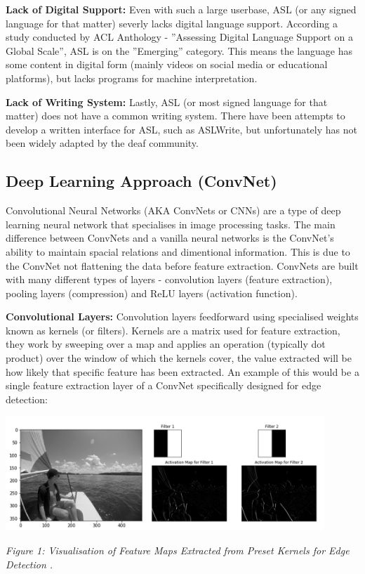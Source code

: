 \documentclass[11pt]{article}
\def\paraskip{\vskip 0.4cm}
\begin{document}
        \noindent\textbf{Lack of Digital Support:} Even with such a large userbase, ASL (or any signed language for that matter) severly lacks digital language support. According a study conducted by ACL Anthology - ”Assessing Digital Language Support on a Global Scale”, ASL is on the ”Emerging” category. This means the language has some content in digital form (mainly videos on social media or educational platforms), but lacks programs for machine interpretation.
        \paraskip

        \noindent\textbf{Lack of Writing System:} Lastly, ASL (or most signed language for that matter) does not have a common writing system. There have been attempts to develop a written interface for ASL, such as ASLWrite, but unfortunately has not been widely adapted by the deaf community.

    \subsection{Deep Learning Approach (ConvNet)}
        Convolutional Neural Networks (AKA ConvNets or CNNs) are a type of deep learning neural network that specialises in image processing tasks. The main difference between ConvNets and a vanilla neural networks is the ConvNet's ability to maintain spacial relations and dimentional information. This is due to the ConvNet not flattening the data before feature extraction. ConvNets are built with many different types of layers - convolution layers (feature extraction), pooling layers (compression) and ReLU layers (activation function).

        \paraskip

        \noindent\textbf{Convolutional Layers: } Convolution layers feedforward using specialised weights known as kernels (or filters). Kernels are a matrix used for feature extraction, they work by sweeping over a map and applies an operation (typically dot product) over the window of which the kernels cover, the value extracted will be how likely that specific feature has been extracted. An example of this would be a single feature extraction layer of a ConvNet specifically designed for edge detection: 

        \begin{center}
            \includegraphics[width=12cm]{kernels.png}
            \\
            \raggedright \textit{
            Figure 1: Visualisation of Feature Maps Extracted from Preset Kernels for Edge Detection \cite{cnn goat}.
            }
        \end{center}
        
\end{document}
